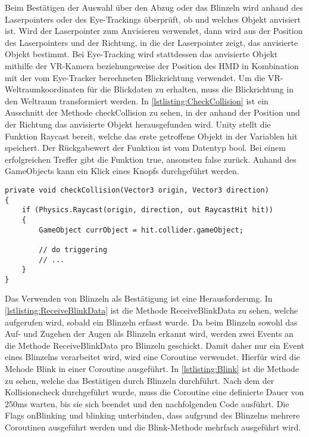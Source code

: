 Beim Bestätigen der Auswahl über den Abzug oder das Blinzeln wird anhand des Laserpointers oder des Eye-Trackings überprüft, ob und welches Objekt anvisiert ist. Wird der Laserpointer zum Anvisieren verwendet, dann wird aus der Position des Laserpointers und der Richtung, in die der Laserpointer zeigt, das anvisierte Objekt bestimmt. Bei Eye-Tracking wird stattdessen das anvisierte Objekt mithilfe der \ac{VR}-Kamera beziehungsweise der Position des \ac{HMD} in Kombination mit der vom Eye-Tracker berechneten Blickrichtung verwendet. Um die \ac{VR}-Weltraumkoordinaten für die Blickdaten zu erhalten, muss die Blickrichtung in den Weltraum transformiert werden. In \autoref{lstlisting:CheckCollision} ist ein Ausschnitt der Methode {\ttfamily checkCollision} zu sehen, in der anhand der Position und der Richtung das anvisierte Objekt herausgefunden wird. Unity stellt die Funktion {\ttfamily Raycast} bereit, welche das erste getroffene Objekt in der Variablen {\ttfamily hit} speichert. Der Rückgabewert der Funktion ist vom Datentyp {\ttfamily bool}. Bei einem erfolgreichen Treffer gibt die Funktion {\ttfamily true}, ansonsten {\ttfamily false} zurück. Anhand des {\ttfamily GameObjects} kann ein Klick eines Knopfs durchgeführt werden.

\begin{lstlisting}[caption=Ausschnitt aus Methode checkCollision,label=lstlisting:CheckCollision]
private void checkCollision(Vector3 origin, Vector3 direction)
{
	if (Physics.Raycast(origin, direction, out RaycastHit hit))
	{
		GameObject currObject = hit.collider.gameObject;
		
		// do triggering
		// ...
	}
}
\end{lstlisting}

Das Verwenden von Blinzeln als Bestätigung ist eine Herausforderung. In \autoref{lstlisting:ReceiveBlinkData} ist die Methode {\ttfamily ReceiveBlinkData} zu sehen, welche aufgerufen wird, sobald ein Blinzeln erfasst wurde. Da beim Blinzeln sowohl das Auf- und Zugehen der Augen als Blinzeln erkannt wird, werden zwei Events an die Methode {\ttfamily ReceiveBlinkData} pro Blinzeln geschickt. Damit daher nur ein Event eines Blinzelns verarbeitet wird, wird eine Coroutine verwendet. Hierfür wird die Mehode {\ttfamily Blink} in einer Coroutine ausgeführt. In \autoref{lstlisting:Blink} ist die Methode zu sehen, welche das Bestätigen durch Blinzeln durchführt. Nach dem der Kollisionscheck durchgeführt wurde, muss die Coroutine eine definierte Dauer von 250ms warten, bis sie sich beendet und den nachfolgenden Code ausführt. Die Flags {\ttfamily onBlinking} und {\ttfamily blinking} unterbinden, dass aufgrund des Blinzelns mehrere Coroutinen ausgeführt werden und die Blink-Methode mehrfach ausgeführt wird.

